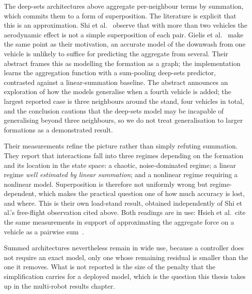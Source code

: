 The deep-sets architectures above aggregate per-neighbour terms by summation, which commits them
to a form of superposition. The literature is explicit that this is an approximation.
Shi et al.~\cite{shi2020neuralswarm} observe that with more than two vehicles the aerodynamic
effect is not a simple superposition of each pair. Gielis et al.~\cite{gielis2023aggregate} make
the same point as their motivation, an accurate model of the downwash from one vehicle is
unlikely to suffice for predicting the aggregate from several. Their abstract frames this as
modelling the formation as a graph; the implementation learns the aggregation function with a
sum-pooling deep-sets predictor, contrasted against a linear-summation baseline.
The abstract announces an exploration of how the models generalise when a fourth vehicle is added;
the largest reported case is three neighbours around the stand, four vehicles in total, and the
conclusion cautions that the deep-sets model may be incapable of generalising beyond three
neighbours, so we do not treat generalisation to larger formations as a demonstrated result.

Their measurements refine the picture rather than simply refuting summation. They report that
interactions fall into three regimes depending on the formation and its location in the state
space: a chaotic, noise-dominated regime; a linear regime \emph{well estimated by linear
summation}; and a nonlinear regime requiring a nonlinear model. Superposition is therefore not
uniformly wrong but regime-dependent, which makes the practical question one of how much accuracy
is lost, and where. This is their own load-stand result, obtained independently of Shi et al.'s
free-flight observation cited above.
Both readings are in use: Hsieh et al.\ cite the same measurements in support of approximating the
aggregate force on a vehicle as a pairwise sum~\cite{hsieh2025onlineadaptation}.

Summed architectures nevertheless remain in wide use, because a controller does not require an
exact model, only one whose remaining residual is smaller than the one it removes. What is not
reported is the size of the penalty that the simplification carries for a deployed model, which is
the question this thesis takes up in the multi-robot results chapter.

